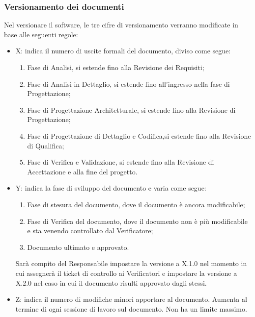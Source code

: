 \subsubsection{Versionamento dei documenti}
\label{6.3}
Nel versionare il software, le tre cifre di versionamento verranno modificate in base alle seguenti regole:
\begin{itemize}
\item X: indica il numero di uscite formali del documento, diviso come segue:
\begin{enumerate}
\item Fase di Analisi, si estende fino alla Revisione dei Requisiti;
\item Fase di Analisi in Dettaglio, si estende fino all'ingresso nella fase di Progettazione;
\item Fase di Progettazione Architetturale, si estende fino alla Revisione di Progettazione;
\item Fase di Progettazione di Dettaglio e Codifica,si estende fino alla Revisione di Qualifica;
\item Fase di Verifica e Validazione, si estende fino alla Revisione di Accettazione e alla fine del progetto.
\end{enumerate}
\item Y: indica la fase di sviluppo del documento e varia come segue:
\begin{enumerate}[start=0]
\item Fase di stesura del documento, dove il documento è ancora modificabile;
\item Fase di Verifica del documento, dove il documento non è più modificabile e sta venendo controllato dal Verificatore;
\item Documento ultimato e approvato.
\end{enumerate}
Sarà compito del Responsabile impostare la versione a X.1.0 nel momento in cui assegnerà il ticket di controllo ai Verificatori e impostare la versione a X.2.0 nel caso in cui il documento risulti approvato dagli stessi.
\item Z: indica il numero di modifiche minori apportare al documento. Aumenta al termine di ogni sessione di lavoro sul documento. Non ha un limite massimo.
\end{itemize}

